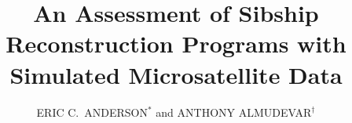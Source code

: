 

\newcommand{\myTitle}{An Assessment of Sibship Reconstruction Programs with Simulated Microsatellite Data}
\title{\myTitle}


\newcommand{\myAuthors}{ERIC C.~ANDERSON$^*$ and ANTHONY ALMUDEVAR$^\dagger$} 
\author{\myAuthors}


\newcommand{\myAffiliations}{
$^*${\em Fisheries Ecology Division, Southwest Fisheries Science Center, National Marine Fisheries
Service, National Oceanic and Atmospheric Administration, 110 Shaffer Road, Santa Cruz, CA 95060, USA}.
$^\dagger${\em Department of Biostatistics and Computational Biology,
University of Rochester Medical School, Rochester, NY}
}
\renewcommand{\AuthorAddresses}{\myAffiliations}


\renewcommand{\KeyWords}{Pedigree Reconstruction, Sibling Group Inference}

\renewcommand{\CorrespondingAuthor}{Eric C. Anderson, Fisheries Ecology Division, Southwest Fisheries Science
Center, 110 Shaffer Road, Santa Cruz, CA 95060. eric.anderson@noaa.gov}


\renewcommand{\RunningTitle}{Sibship Inference Comparison}

\newcommand{\myEmailAddress}{eric.anderson@noaa.gov}
\newcommand{\myEmailFootnote}{$^\S$}

\newcommand{\myCopyright}{\copyright US Federal Government work in the public domain in the USA}

\newcommand{\myRunningTitle}{\RunningTitle}

\newcommand{\myRunningAuthor}{Anderson \& Almudevar}
